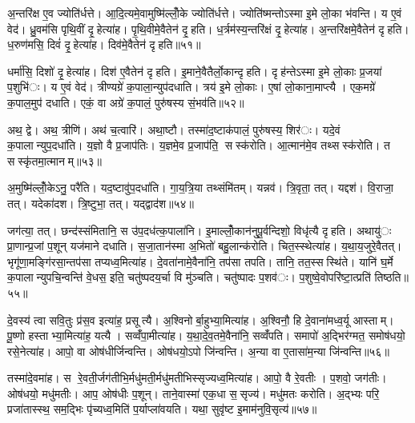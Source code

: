 अ॒न्तरि॑क्ष ए॒व ज्योति॑र्धत्ते। आ॒दि॒त्यमे॒वामुष्मि॑ल्लोँ॒के ज्योति॑र्धत्ते। ज्योति॑ष्मन्तोऽस्मा इ॒मे लो॒का भ॑वन्ति। य ए॒वं वेद॑। ध्रु॒वम॑सि पृथि॒वीं दृ॒हेत्या॑ह। पृ॒थि॒वीमे॒वैतेन॑ दृ॒हति। ध॒र्त्रम॑स्य॒न्तरि॑क्षं दृ॒हेत्या॑ह। अ॒न्तरि॑क्षमे॒वैतेन॑ दृहति। ध॒रुण॑मसि॒ दिवं॑ दृ॒हेत्या॑ह। दिव॑मे॒वैतेन॑ दृहति॥५१॥

धर्मा॑सि॒ दिशो॑ दृ॒हेत्या॑ह। दिश॑ ए॒वैतेन॑ दृहति। इ॒माने॒वैतैर्लो॒कान्दृहति। दृह॑न्तेऽस्मा इ॒मे लो॒काः प्र॒जया॑ प॒शुभि॑ः। य ए॒वं वेद॑। त्रीण्यग्रे॑ क॒पाला॒न्युप॑दधाति। त्रय॑ इ॒मे लो॒काः। ए॒षां लो॒काना॒माप्त्यै। एक॒मग्रे॑ क॒पाल॒मुप॑ दधाति। एकं॒ वा अग्रे॑ क॒पालं॒ पुरु॑षस्य सं॒भव॑ति॥५२॥

अथ॒ द्वे। अथ॒ त्रीणि॑। अथ॑ च॒त्वारि॑। अथा॒ष्टौ। तस्मा॑द॒ष्टाक॑पालं॒ पुरु॑षस्य॒ शिर॑ः। यदे॒वं क॒पालान्युप॒दधा॑ति। य॒ज्ञो वै प्र॒जाप॑तिः। य॒ज्ञमे॒व प्र॒जाप॑ति॒ सस्क॑रोति। आ॒त्मान॑मे॒व तथ्सस्क॑रोति। त सस्कृ॑तमा॒त्मानम्॥५३॥

अ॒मुष्मि॑ल्लोँ॒केऽनु॒ परै॑ति। यद॒ष्टावु॑प॒दधा॑ति। गा॒य॒त्रि॒या तथ्संमि॑तम्। यन्नव॑। त्रि॒वृता॒ तत्। यद्दश॑। वि॒राजा॒ तत्। यदेका॑दश। त्रि॒ष्टुभा॒ तत्। यद्द्वाद॑श॥५४॥

जग॑त्या॒ तत्। छन्द॑स्संमितानि॒ स उ॑प॒दध॑त्क॒पाला॑नि। इ॒माल्लोँ॒कान॑नुपू॒र्वन्दिशो॒ विधृ॑त्यै दृहति। अथायु॑ः प्रा॒णान्प्र॒जां प॒शून् यज॑माने दधाति। स॒जा॒तान॑स्मा अ॒भितो॑ बहु॒लान्क॑रोति। चित॒स्स्थेत्या॑ह। य॒था॒य॒जुरे॒वैतत्। भृगू॑णा॒मङ्गि॑रसा॒न्तप॑सा तप्यध्व॒मित्या॑ह। दे॒वता॑नामे॒वैना॑नि॒ तप॑सा तपति। तानि॒ तत॒स्सस्थि॑ते। यानि॑ घ॒र्मे क॒पालान्युपचि॒न्वन्ति॑ वे॒धस॒ इति॒ चतु॑ष्पदय॒र्चा वि मु॑ञ्चति। चतु॑ष्पादः प॒शव॑ः। प॒शुष्वे॒वोपरि॑ष्टा॒त्प्रति॑ तिष्ठति॥५५॥


दे॒वस्य॑ त्वा सवि॒तुः प्र॑स॒व इत्या॑ह॒ प्रसूत्यै। अ॒श्विनोर्बा॒हुभ्या॒मित्या॑ह। अ॒श्विनौ॒ हि दे॒वाना॑मध्व॒र्यू आस्ताम्। पू॒ष्णो हस्ताभ्या॒मित्या॑ह॒ यत्यै। सव्वँ॑पा॒मीत्या॑ह। य॒था॒दे॒व॒तमे॒वैना॑नि॒ सव्वँ॑पति। समापो॑ अ॒द्भिर॑ग्मत॒ समोष॑धयो॒ रसे॒नेत्या॑ह। आपो॒ वा ओष॑धीर्जिन्वन्ति। ओष॑धयो॒ऽपो जि॑न्वन्ति। अ॒न्या वा ए॒तासा॑म॒न्या जि॑न्वन्ति॥५६॥

तस्मा॑दे॒वमा॑ह। स रे॒वती॒र्जग॑तीभि॒र्मधु॑मती॒र्मधु॑मतीभिस्सृज्यध्व॒मित्या॑ह। आपो॒ वै रे॒वतीः। प॒शवो॒ जग॑तीः। ओष॑धयो॒ मधु॑मतीः। आप॒ ओष॑धीः प॒शून्। ताने॒वास्मा॑ एक॒धा स॒सृज्य॑। मधु॑मतः करोति। अ॒द्भ्यः परि॒ प्रजा॑तास्स्थ॒ सम॒द्भिः पृ॑च्यध्व॒मिति॑ प॒र्याप्ला॑वयति। यथा॒ सुवृ॑ष्ट इ॒माम॑नुवि॒सृत्य॑॥५७॥

